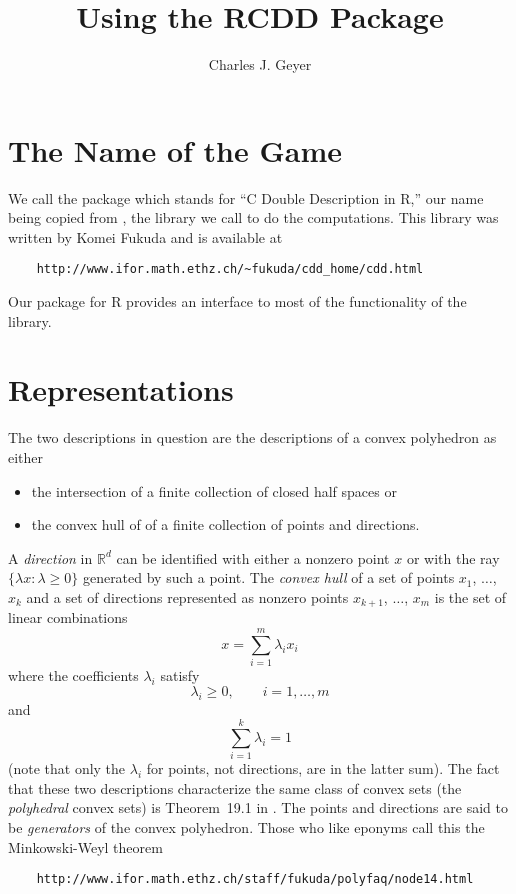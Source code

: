 \documentclass{article}
\newcommand{\real}{\mathbb{R}}
\begin{document}
\title{Using the RCDD Package}
\author{Charles J. Geyer}
\maketitle



\section{The Name of the Game}

We call the package \verb@rcdd@ which stands
for ``C Double Description in R,'' our name being copied from
\verb@cddlib@, the library we call to do the computations.
This library was written by Komei Fukuda and is available at
\begin{verbatim}
    http://www.ifor.math.ethz.ch/~fukuda/cdd_home/cdd.html
\end{verbatim}
Our \verb@rcdd@ package for R provides an interface to most
of the functionality of the \verb@cddlib@ library.

\section{Representations}

The two descriptions in question are the descriptions of a convex polyhedron
as either
\begin{itemize}
\item the intersection of a finite collection of closed half spaces or
\item the convex hull of of a finite collection of points and directions.
\end{itemize}

A \emph{direction} in $\real^d$ can be identified with
either a nonzero point $x$ or with
the ray $\{ \lambda x : \lambda \ge 0 \}$ generated by such a point.  
The \emph{convex hull} of a set of points $x_1$, $\ldots$, $x_k$ and
a set of directions represented as nonzero
points $x_{k + 1}$, $\ldots$, $x_m$ is the set of linear
combinations
$$
   x = \sum_{i = 1}^m \lambda_i x_i
$$
where the coefficients $\lambda_i$ satisfy
$$
   \lambda_i \ge 0, \qquad i = 1, \ldots, m
$$
and
$$
   \sum_{i = 1}^k \lambda_i = 1
$$
(note that only the $\lambda_i$ for points, not directions,
are in the latter sum).
The fact that these two descriptions characterize the same class of
convex sets (the \emph{polyhedral} convex sets) is Theorem~19.1
in \citet{rocky}.
The points and directions are said to be \emph{generators} of the
convex polyhedron.  Those who like eponyms call this the
Minkowski-Weyl theorem
\begin{verbatim}
    http://www.ifor.math.ethz.ch/staff/fukuda/polyfaq/node14.html
\end{verbatim}
\end{document}
